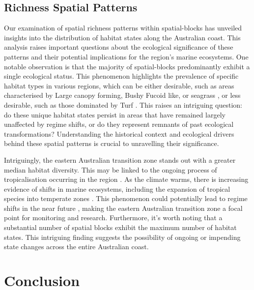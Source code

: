 \begin{refsection}
\hypertarget{richness-spatial-patterns}{%
\subsection{Richness Spatial Patterns}\label{richness-spatial-patterns}}

Our examination of spatial richness patterns within spatial-blocks has
unveiled insights into the distribution of habitat states along the
Australian coast. This analysis raises important questions about the
ecological significance of these patterns and their potential
implications for the region's marine ecosystems. One notable observation
is that the majority of spatial-blocks predominantly exhibit a single
ecological status. This phenomenon highlights the prevalence of specific
habitat types in various regions, which can be either desirable, such as
areas characterised by Large canopy forming, Bushy Fucoid like, or
seagrass \autocites[ ]{Coleman_2017}[ ]{Filbee-Dexter_2018}{Janes_2021},
or less desirable, such as those dominated by Turf
\autocite{Filbee-Dexter_2018}. This raises an intriguing question: do
these unique habitat states persist in areas that have remained largely
unaffected by regime shifts, or do they represent remnants of past
ecological transformations? Understanding the historical context and
ecological drivers behind these spatial patterns is crucial to
unravelling their significance.

Intriguingly, the eastern Australian transition zone stands out with a
greater median habitat diversity. This may be linked to the ongoing
process of tropicalisation occurring in the region
\autocite{Figueira_2010}. As the climate warms, there is increasing
evidence of shifts in marine ecosystems, including the expansion of
tropical species into temperate zones \autocite{Verges_2014}. This
phenomenon could potentially lead to regime shifts in the near future
\autocite{Verges_2019}, making the eastern Australian transition zone a
focal point for monitoring and research. Furthermore, it's worth noting
that a substantial number of spatial blocks exhibit the maximum number
of habitat states. This intriguing finding suggests the possibility of
ongoing or impending state changes across the entire Australian coast.

\clearpage

\hypertarget{conclu-chapt3}{%
\section{Conclusion}\label{conclu-chapt3}}


\end{refsection}
